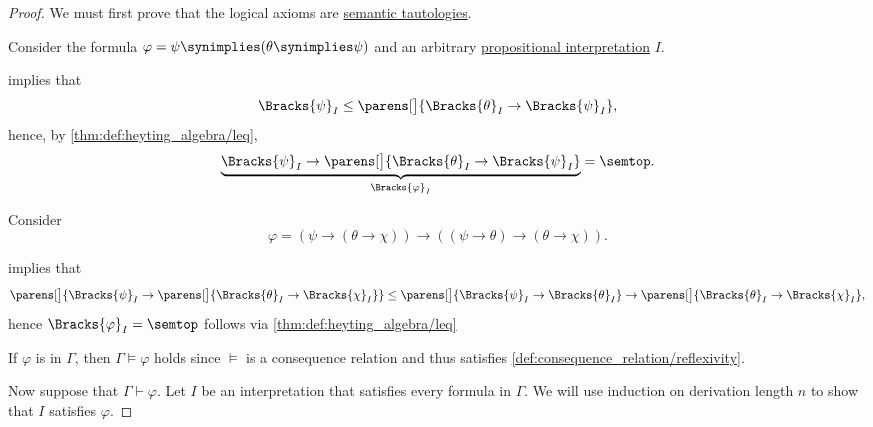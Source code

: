 \begin{proof}
   We must first prove that the logical axioms are \hyperref[def:propositional_semantics/tautology]{semantic tautologies}.

   Consider the formula \( \varphi = \psi \synimplies (\theta \synimplies \psi) \) and an arbitrary \hyperref[alg:propositional_denotation]{propositional interpretation} \( I \).

   implies that
  \begin{equation*}
    \Bracks{\psi}_I \leq \parens[\big]{ \Bracks{\theta}_I \rightarrow \Bracks{\psi}_I },
  \end{equation*}
  hence, by \cref{thm:def:heyting_algebra/leq},
  \begin{equation*}
    \underbrace{ \Bracks{\psi}_I \rightarrow \parens[\big]{ \Bracks{\theta}_I \rightarrow \Bracks{\psi}_I } }_{\Bracks{\varphi}_I} = \semtop.
  \end{equation*}

   Consider
  \begin{equation*}
    \varphi = (\psi \rightarrow (\theta \rightarrow \chi)) \rightarrow ((\psi \rightarrow \theta) \rightarrow (\theta \rightarrow \chi)).
  \end{equation*}

   implies that
  \begin{equation*}
    \parens[\big]{ \Bracks{\psi}_I \rightarrow \parens[\big]{ \Bracks{\theta}_I \rightarrow \Bracks{\chi}_I } } \leq \parens[\big]{ \Bracks{\psi}_I \rightarrow \Bracks{\theta}_I } \rightarrow \parens[\big]{ \Bracks{\theta}_I \rightarrow \Bracks{\chi}_I },
  \end{equation*}
  hence \( \Bracks{\varphi}_I = \semtop \) follows via \cref{thm:def:heyting_algebra/leq}

   If \( \varphi \) is in \( \Gamma \), then \( \Gamma \vDash \varphi \) holds since \( \vDash \) is a consequence relation and thus satisfies \cref{def:consequence_relation/reflexivity}.

   Now suppose that \( \Gamma \vdash \varphi \). Let \( I \) be an interpretation that satisfies every formula in \( \Gamma \). We will use induction on derivation length \( n \) to show that \( I \) satisfies \( \varphi \).


\end{proof}
